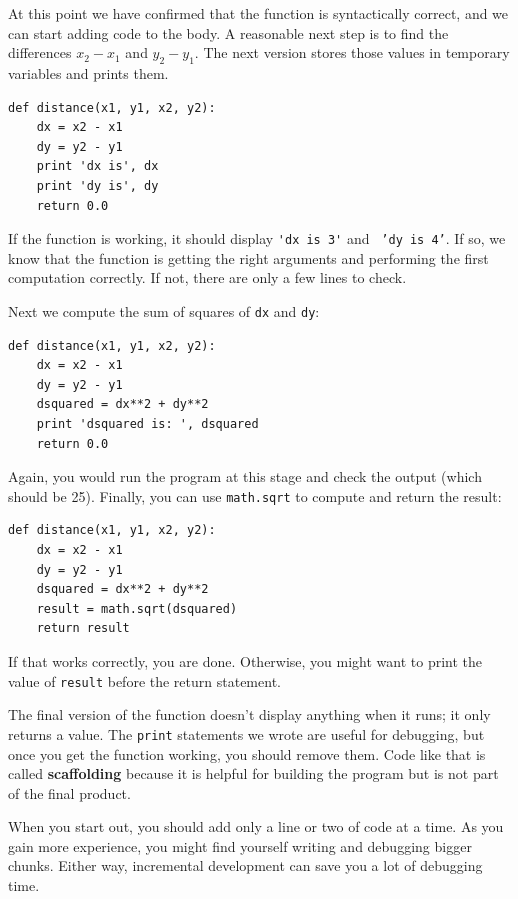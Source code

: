\documentclass[10pt]{book}
\begin{document}

At this point we have confirmed that the function is syntactically
correct, and we can start adding code to the body.
A reasonable next step is to find the differences
$x_2 - x_1$ and $y_2 - y_1$.  The next version stores those values in
temporary variables and prints them.

\beforeverb
\begin{verbatim}
def distance(x1, y1, x2, y2):
    dx = x2 - x1
    dy = y2 - y1
    print 'dx is', dx
    print 'dy is', dy
    return 0.0
\end{verbatim}
\afterverb
%
If the function is working, it should display \verb"'dx is 3'" and {\tt
'dy is 4'}.  If so, we know that the function is getting the right
arguments and performing the first computation correctly.  If not,
there are only a few lines to check.

Next we compute the sum of squares of {\tt dx} and {\tt dy}:

\beforeverb
\begin{verbatim}
def distance(x1, y1, x2, y2):
    dx = x2 - x1
    dy = y2 - y1
    dsquared = dx**2 + dy**2
    print 'dsquared is: ', dsquared
    return 0.0
\end{verbatim}
\afterverb
%
Again, you would run the program at this stage and check the output
(which should be 25).
Finally, you can use {\tt math.sqrt} to compute and return the result:


\beforeverb
\begin{verbatim}
def distance(x1, y1, x2, y2):
    dx = x2 - x1
    dy = y2 - y1
    dsquared = dx**2 + dy**2
    result = math.sqrt(dsquared)
    return result
\end{verbatim}
\afterverb
%
If that works correctly, you are done.  Otherwise, you might
want to print the value of {\tt result} before the return
statement.

The final version of the function doesn't display anything when it
runs; it only returns a value.  The {\tt print} statements we wrote
are useful for debugging, but once you get the function working, you
should remove them.  Code like that is called {\bf scaffolding}
because it is helpful for building the program but is not part of the
final product.


When you start out, you should add only a line or two of code at a
time.  As you gain more experience, you might find yourself writing
and debugging bigger chunks.  Either way, incremental development
can save you a lot of debugging time.
\end{document}

